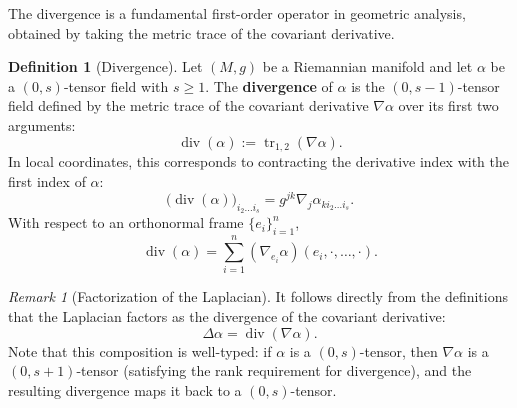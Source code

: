 \documentclass[11pt]{article}
\theoremstyle{plain}
\theoremstyle{definition}
\newtheorem{definition}[theorem]{Definition}
\theoremstyle{remark}
\newtheorem{remark}[theorem]{Remark}
\newcommand{\Div}{\operatorname{div}}
\begin{document}
The divergence is a fundamental first-order operator in geometric
analysis, obtained by taking the metric trace of the covariant derivative.


\begin{definition}[Divergence]
\label{def:divergence}
    Let $(M, g)$ be a Riemannian manifold and let $\alpha$ be a $(0,s)$-tensor field with $s \ge 1$.
    The \textbf{divergence} of $\alpha$ is the $(0,s-1)$-tensor field defined by the metric trace of the covariant derivative $\nabla \alpha$ over its first two arguments:
    \begin{equation}
        \Div(\alpha) := \operatorname{tr}_{1,2} (\nabla \alpha).
    \end{equation}
    In local coordinates, this corresponds to contracting the derivative index with the first index of $\alpha$:
    \begin{equation}
        \big(\Div(\alpha) \big)_{i_2 \dots i_s} = g^{jk} \nabla_j \alpha_{k i_2 \dots i_s}.
    \end{equation}
With respect to an orthonormal frame $\{e_i\}_{i=1}^n$,
\begin{equation}
  \Div(\alpha) = \sum_{i=1}^n (\nabla_{e_i} \alpha ) (e_i,\cdot,\ldots,\cdot) .
\end{equation}
\end{definition}

\begin{remark}[Factorization of the Laplacian]
\label{rem:laplacian_div_grad}
    It follows directly from the definitions that the Laplacian factors as the divergence of the covariant derivative:
    \begin{equation}
        \Delta \alpha = \Div(\nabla \alpha).
    \end{equation}
    Note that this composition is well-typed: if $\alpha$ is a $(0,s)$-tensor, then $\nabla \alpha$ is a $(0,s+1)$-tensor (satisfying the rank requirement for divergence), and the resulting divergence maps it back to a $(0,s)$-tensor.
\end{remark}



\end{document}
